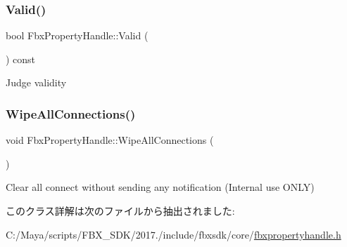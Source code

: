 \subsubsection{\texorpdfstring{Valid()}{Valid()}}
{\footnotesize\ttfamily bool Fbx\+Property\+Handle\+::\+Valid (\begin{DoxyParamCaption}{ }\end{DoxyParamCaption}) const}



Judge validity 

\mbox{\label{class_fbx_property_handle_abac85431f7a869fe1cf8a8cb1e8097ec}} 
\subsubsection{\texorpdfstring{Wipe\+All\+Connections()}{WipeAllConnections()}}
{\footnotesize\ttfamily void Fbx\+Property\+Handle\+::\+Wipe\+All\+Connections (\begin{DoxyParamCaption}{ }\end{DoxyParamCaption})}



Clear all connect without sending any notification (Internal use O\+N\+LY) 



このクラス詳解は次のファイルから抽出されました\+:\begin{DoxyCompactItemize}
\item 
C\+:/\+Maya/scripts/\+F\+B\+X\+\_\+\+S\+D\+K/2017./include/fbxsdk/core/\hyperlink{fbxpropertyhandle_8h}{fbxpropertyhandle.\+h}\end{DoxyCompactItemize}
